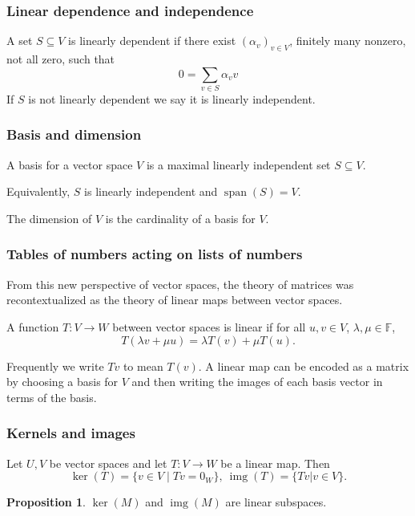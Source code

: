 \documentclass{beamer}
\DeclareMathOperator{\img}{img}
\theoremstyle{definition}
\newtheorem*{proposition*}{Proposition}
\begin{document}
\begin{frame}
    \frametitle{Linear dependence and independence}

    \begin{definition}
        A set $S \subseteq V$ is linearly dependent if there exist $(\alpha_v)_{v \in V}$, finitely many nonzero, not all zero, such that
        \[
            0 = \sum_{v \in S} \alpha_v v
        \]
        If $S$ is not linearly dependent we say it is linearly independent.
    \end{definition}
\end{frame}

\begin{frame}
    \frametitle{Basis and dimension}

    \begin{definition}
        A basis for a vector space $V$ is a maximal linearly independent set $S \subseteq V$.

        Equivalently, $S$ is linearly independent and $\operatorname{span}(S) = V$.
    \end{definition}
    \begin{definition}
        The dimension of $V$ is the cardinality of a basis for $V$.
    \end{definition}
\end{frame}

\begin{frame}
    \frametitle{Tables of numbers acting on lists of numbers}

    From this new perspective of vector spaces, the theory of matrices was recontextualized as the theory of linear maps between vector spaces.
    \pause
    \begin{definition}
        A function $T: V \longrightarrow W$ between vector spaces is linear if for all $u, v \in V$, $\lambda, \mu \in \mathbb{F}$,
        \[
            T(\lambda v + \mu u) = \lambda T(v) + \mu T(u).
        \]
    \end{definition}
    Frequently we write $Tv$ to mean $T(v)$.
    \pause
    A linear map can be encoded as a matrix by choosing a basis for $V$ and then writing the images of each basis vector in terms of the basis.
\end{frame}

\begin{frame}
    \frametitle{Kernels and images}

    \begin{definition}
        Let $U, V$ be vector spaces and let $T: V \longrightarrow W$ be a linear map. Then
        \[
            \ker(T) = \{v \in V \mid Tv = 0_W\}, \ \img(T) = \{Tv | v \in V\}.
        \]
    \end{definition}
    \begin{proposition*}
        $\ker(M)$ and $\img(M)$ are linear subspaces.
    \end{proposition*}
\end{frame}
\end{document}
